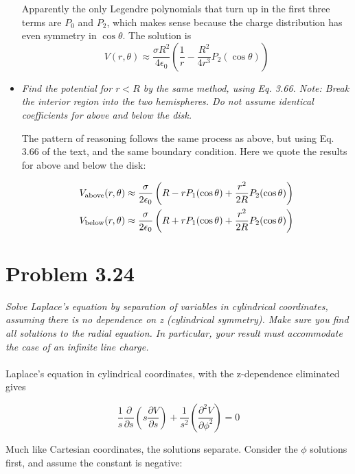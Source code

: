 \documentclass[10pt]{article}
\begin{document}
\begin{itemize}
Apparently the only Legendre polynomials that turn up in the first three terms are $P_0$ and $P_2$, which makes sense because the charge distribution has even symmetry in $\cos\theta$.  The solution is
\begin{equation}
V(r,\theta) \approx \frac{\sigma R^2}{4\epsilon_0}\left( \frac{1}{r} - \frac{R^2}{4r^3}P_2(\cos\theta)\right)
\end{equation}

\item \textit{Find the potential for $r < R$ by the same method, using Eq. 3.66.  Note: Break the interior region into the two hemispheres.  Do not assume identical coefficients for above and below the disk.}

The pattern of reasoning follows the same process as above, but using Eq. 3.66 of the text, and the same boundary condition.  Here we quote the results for above and below the disk:

\begin{align}
V_{\rm above}(r,\theta) &\approx \frac{\sigma}{2\epsilon_0} \left( R - rP_1(\cos\theta) + \frac{r^2}{2R}P_2(\cos\theta) \right) \\
V_{\rm below}(r,\theta) &\approx \frac{\sigma}{2\epsilon_0} \left( R + rP_1(\cos\theta) + \frac{r^2}{2R}P_2(\cos\theta) \right)
\end{align}
\end{itemize}


\section{Problem 3.24}

\textit{Solve Laplace's equation by separation of variables in cylindrical coordinates, assuming there is no dependence on z (cylindrical symmetry).  Make sure you find all solutions to the radial equation. In particular, your result must accommodate the case of an infinite line charge.} \\ \\

Laplace's equation in cylindrical coordinates, with the z-dependence eliminated gives

\begin{equation}
\frac{1}{s}\frac{\partial}{\partial s}\left( s \frac{\partial V}{\partial s} \right) + \frac{1}{s^2} \left( \frac{\partial^2 V}{\partial \phi^2} \right) = 0
\end{equation}

Much like Cartesian coordinates, the solutions separate.  Consider the $\phi$ solutions first, and assume the constant is negative:
\end{document}
